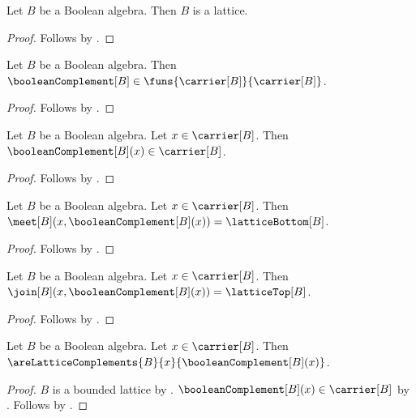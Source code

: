 \begin{proposition}\label{boolean_algebra_is_lattice}
    Let $B$ be a Boolean algebra.
    Then $B$ is a lattice.
\end{proposition}
\begin{proof}
    Follows by
        .
\end{proof}

\begin{proposition}\label{boolean_complement_type}
    Let $B$ be a Boolean algebra.
    Then $\booleanComplement[B]\in
        \funs{\carrier[B]}{\carrier[B]}$.
\end{proposition}
\begin{proof}
    Follows by .
\end{proof}

\begin{proposition}\label{boolean_complement_apply_type}
    Let $B$ be a Boolean algebra.
    Let $x\in\carrier[B]$.
    Then $\booleanComplement[B](x)\in\carrier[B]$.
\end{proposition}
\begin{proof}
    Follows by .
\end{proof}

\begin{proposition}\label{boolean_meet_complement}
    Let $B$ be a Boolean algebra.
    Let $x\in\carrier[B]$.
    Then $\meet[B](x,\booleanComplement[B](x))
        =\latticeBottom[B]$.
\end{proposition}
\begin{proof}
    Follows by .
\end{proof}

\begin{proposition}\label{boolean_join_complement}
    Let $B$ be a Boolean algebra.
    Let $x\in\carrier[B]$.
    Then $\join[B](x,\booleanComplement[B](x))
        =\latticeTop[B]$.
\end{proposition}
\begin{proof}
    Follows by .
\end{proof}

\begin{proposition}\label{boolean_are_lattice_complements}
    Let $B$ be a Boolean algebra.
    Let $x\in\carrier[B]$.
    Then $\areLatticeComplements{B}{x}{\booleanComplement[B](x)}$.
\end{proposition}
\begin{proof}
    $B$ is a bounded lattice by
        .
    $\booleanComplement[B](x)\in\carrier[B]$ by
        .
    Follows by
        .
\end{proof}

